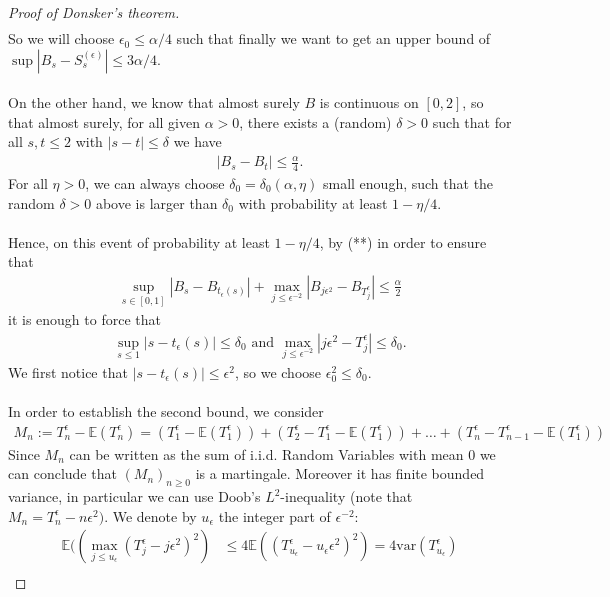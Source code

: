 \documentclass[../mainfile.tex]{subfiles}
\begin{document}
\begin{proof}[Proof of Donsker's theorem]
\begin{align*}
\end{align*}
So we will choose $\epsilon_0 \leq \alpha/4$ such that finally we want to get an upper bound of $\sup |B_s-S_s^{( \epsilon)}| \leq  3\alpha /4$.
\\\\
On the other hand, we know that almost surely $B$ is continuous on $[0,2]$, so that almost surely, for all given $\alpha >0$, there exists a (random) $\delta >0$ such that for all $s,t \leq 2$ with $|s-t| \leq \delta$ we have  
\begin{align*}
|B_s-B_t| \leq \frac{\alpha}{4}. \tag{**}
\end{align*}
For all $\eta >0$, we can always choose $\delta_0=\delta_0( \alpha, \eta)$ small enough, such that the random $\delta>0$ above is larger than $\delta_0$ with probability at least $1-\eta/4$.  \\\\
Hence, on this event of probability at least $1- \eta/4$, by (**) in order to ensure that
\begin{align*}
 \sup_{s \in [0,1]} |B_s-B_{t_\epsilon(s)}| + \max_{j \leq \epsilon^{- 2}} |B_{j \epsilon^2}-B_{T_j^\epsilon}| \leq \frac{\alpha}{2} 
\end{align*}
it is enough to force that
\begin{align*}
\sup_{ s \leq 1} |s-t_\epsilon(s)| \leq \delta_0 \text{ and } \max_{j \leq \epsilon^{-2}} |j \epsilon^2 -T_j^\epsilon| \leq \delta_0.
\end{align*}
\newpage
We first notice that $|s-t_\epsilon(s)| \leq \epsilon^2$, so we choose $\epsilon_0^2 \leq \delta_0$. \\
\\
In order to establish the second bound, we consider 
\begin{align*}
M_n:= T_n^\epsilon- \mathbb{E}(T_n^\epsilon)= (T_1^\epsilon- \mathbb{E}(T_1^\epsilon))+ ( T_2^\epsilon-T_1^\epsilon- \mathbb{E}(T_1^\epsilon))+ \dots + ( T_n^\epsilon-T_{n-1}^\epsilon - \mathbb{E}(T_1^\epsilon))
\end{align*}
Since $M_n$ can be written as the sum of i.i.d. Random Variables with mean $0$ we can conclude that $(M_n)_{n \geq 0}$ is a martingale. Moreover it has finite bounded variance, in particular we can use Doob's $L^2$-inequality (note that $M_n= T_n^\epsilon- n \epsilon^2)$. We denote by $u_\epsilon$ the integer part of $\epsilon^{-2}$: 
\begin{align*}
\mathbb{E}( ( \max_{j \leq u_\epsilon} (T_j^\epsilon-j \epsilon^2)^2)& \leq 4 \mathbb{E}((T_{u_\epsilon}^\epsilon-u_\epsilon \epsilon^2)^2) = 4 \text{var}(T_{u_\epsilon}^\epsilon) \\

\end{align*}
\end{proof}
\end{document}
